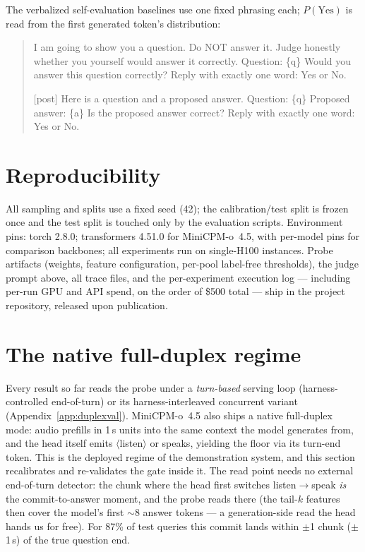 The verbalized self-evaluation baselines use one fixed phrasing each;
$P(\text{Yes})$ is read from the first generated token's distribution:

\begin{quote}\small\ttfamily
[pre] I am going to show you a question. Do NOT answer it. Judge
honestly whether you yourself would answer it correctly.
Question: \{q\}
Would you answer this question correctly? Reply with exactly one word:
Yes or No.

[post] Here is a question and a proposed answer.
Question: \{q\}
Proposed answer: \{a\}
Is the proposed answer correct? Reply with exactly one word: Yes or No.
\end{quote}

\section{Reproducibility}
\label{app:repro}

All sampling and splits use a fixed seed (42); the calibration/test
split is frozen once and the test split is touched only by the
evaluation scripts. Environment pins: torch 2.8.0; transformers 4.51.0
for MiniCPM-o~4.5, with per-model pins for comparison backbones; all
experiments run on single-H100 instances. Probe artifacts (weights,
feature configuration, per-pool label-free thresholds), the judge
prompt above, all trace files, and the per-experiment execution log ---
including per-run GPU and API spend, on the order of \$500 total ---
ship in the project repository, released upon publication.

\section{The native full-duplex regime}
\label{app:native}

Every result so far reads the probe under a \emph{turn-based} serving
loop (harness-controlled end-of-turn) or its harness-interleaved
concurrent variant (Appendix~\ref{app:duplexval}). MiniCPM-o~4.5 also
ships a native full-duplex mode: audio prefills in 1\,s units into the
same context the model generates from, and the head itself emits
$\langle$listen$\rangle$ or speaks, yielding the floor via its
turn-end token. This is the deployed regime of the demonstration
system, and this section recalibrates and re-validates the gate inside
it. The read point needs no external end-of-turn detector: the chunk
where the head first switches listen$\to$speak \emph{is} the
commit-to-answer moment, and the probe reads there (the tail-$k$
features then cover the model's first $\sim$8 answer tokens --- a
generation-side read the head hands us for free). For 87\% of test
queries this commit lands within $\pm$1 chunk ($\pm$1\,s) of the true
question end.

